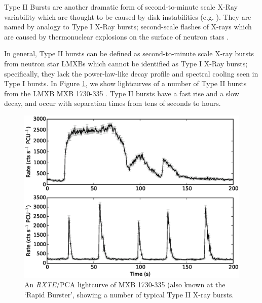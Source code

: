 \par Type II Bursts are another dramatic form of second-to-minute scale X-Ray variability which are thought to be caused by disk instabilities (e.g. \citealp{Lewin_TypeII}).  They are named by analogy to Type I X-Ray bursts; second-scale flashes of X-rays which are caused by thermonuclear explosions on the surface of neutron stars \citep{vanParadijs_TypeI,Lewin_Bursts}.
\par In general, Type II bursts can be defined as second-to-minute scale X-ray bursts from neutron star LMXBs which cannot be identified as Type I X-Ray bursts; specifically, they lack the power-law-like decay profile \citep{intZand_Decay} and spectral cooling \citep{Hoffman_T1Cool} seen in Type I bursts.  In Figure \ref{fig:BgB}, we show lightcurves of a number of Type II bursts from the LMXB MXB 1730-335 \citep{Bagnoli_PopStudy}.  Type II bursts have a fast rise and a slow decay, and occur with separation times from tens of seconds to hours.

\begin{figure}
  \centering
  \includegraphics[width=.9\linewidth, trim= 0mm 0mm 0mm 80mm,clip]{images/bagnoli_bursts.eps}
  \caption{\small An \textit{RXTE}/PCA lightcurve of MXB 1730-335 (also known at the `Rapid Burster', showing a number of typical Type II X-ray bursts.}
  \label{fig:BgB}
\end{figure}

